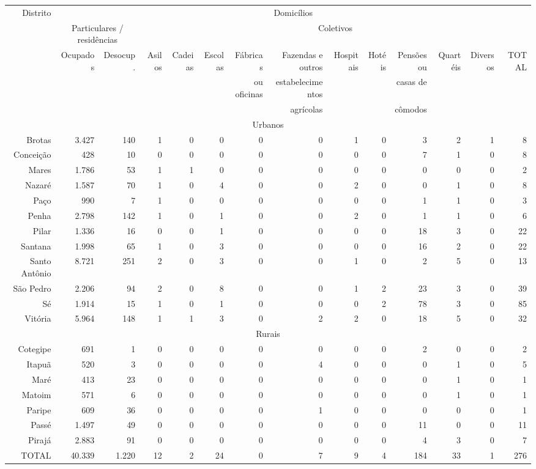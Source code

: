 \begin{landscape}
\begin{table}[!htp]
{
\begin{tiny}
\begin{tabular}{rrrrrrrrrrrrrr}
\hline
\multirow{3}{*}{Distrito} & \multicolumn{13}{c}{Domicílios}\\
\cline{2-14}
 & \multicolumn{2}{c|}{Particulares / residências} & \multicolumn{11}{c}{Coletivos} \\
\cline{2-14}
 & Ocupados & Desocup. & Asilos & Cadeias & Escolas & Fábricas& Fazendas e outros & Hospitais & Hotéis & Pensões ou & Quartéis & Diversos & TOTAL \\
 & & & & & & ou oficinas & estabelecimentos & & & casas de & & & \\
 & & & & & & & agrícolas & & & cômodos & & & \\
\hline
\multicolumn{14}{c}{Urbanos} \\
\hline
Brotas	&3.427	&140	&1	&0	&0	&0	&0	&1	&0	&3	&2	&1	&8\\
Conceição	&428	&10	&0	&0	&0	&0	&0	&0	&0	&7	&1	&0	&8\\
Mares	&1.786	&53	&1	&1	&0	&0	&0	&0	&0	&0	&0	&0	&2\\
Nazaré	&1.587	&70	&1	&0	&4	&0	&0	&2	&0	&0	&1	&0	&8\\
Paço	&990	&7	&1	&0	&0	&0	&0	&0	&0	&1	&1	&0	&3\\
Penha	&2.798	&142	&1	&0	&1	&0	&0	&2	&0	&1	&1	&0	&6\\
Pilar	&1.336	&16	&0	&0	&1	&0	&0	&0	&0	&18	&3	&0	&22\\
Santana	&1.998	&65	&1	&0	&3	&0	&0	&0	&0	&16	&2	&0	&22\\
Santo Antônio	&8.721	&251	&2	&0	&3	&0	&0	&1	&0	&2	&5	&0	&13\\
São Pedro	&2.206	&94	&2	&0	&8	&0	&0	&1	&2	&23	&3	&0	&39\\
Sé	&1.914	&15	&1	&0	&1	&0	&0	&0	&2	&78	&3	&0	&85\\
Vitória	&5.964	&148	&1	&1	&3	&0	&2	&2	&0	&18	&5	&0	&32\\
\hline
\multicolumn{14}{c}{Rurais} \\
\hline
Cotegipe	&691	&1	&0	&0	&0	&0	&0	&0	&0	&2	&0	&0	&2\\
Itapuã	&520	&3	&0	&0	&0	&0	&4	&0	&0	&0	&1	&0	&5\\
Maré	&413	&23	&0	&0	&0	&0	&0	&0	&0	&0	&1	&0	&1\\
Matoim	&571	&6	&0	&0	&0	&0	&0	&0	&0	&0	&1	&0	&1\\
Paripe	&609	&36	&0	&0	&0	&0	&1	&0	&0	&0	&0	&0	&1\\
Passé	&1.497	&49	&0	&0	&0	&0	&0	&0	&0	&11	&0	&0	&11\\
Pirajá	&2.883	&91	&0	&0	&0	&0	&0	&0	&0	&4	&3	&0	&7\\
\hline
TOTAL	&40.339	&1.220	&12	&2	&24	&0	&7	&9	&4	&184	&33	&1	&276\\
\hline
\end{tabular} 
\end{tiny}
}
{}
\end{table}
\end{landscape}